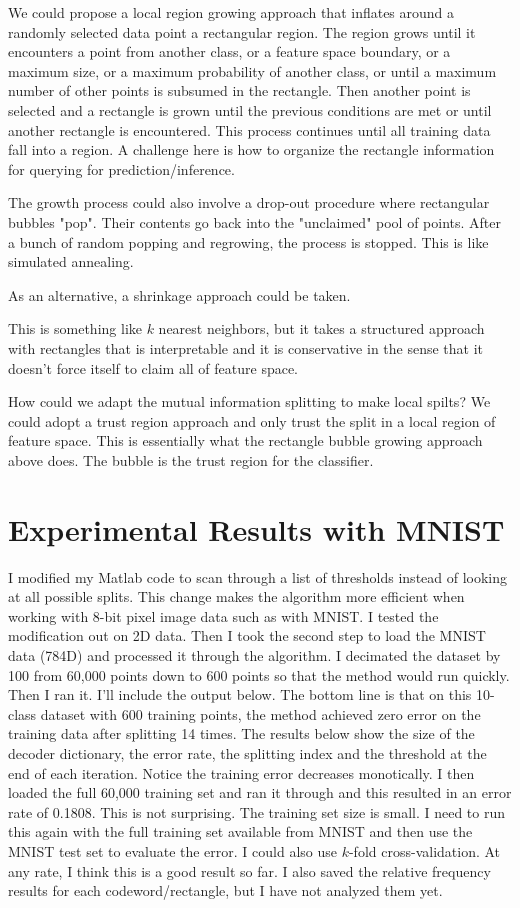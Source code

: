 \documentclass{article}
\begin{document}
We could propose a local region growing approach that inflates around a randomly selected data point a rectangular region.  The region grows until it encounters a point from another class, or a feature space boundary, or a maximum size, or a maximum probability of another class, or until a maximum number of other points is subsumed in the rectangle.  Then another point is selected and a rectangle is grown until the previous conditions are met or until another rectangle is encountered.  This process continues until all training data fall into a region.  A challenge here is how to organize the rectangle information for querying for prediction/inference.

The growth process could also involve a drop-out procedure where rectangular bubbles "pop".  Their contents go back into the "unclaimed" pool of points.  After a bunch of random popping and regrowing, the process is stopped.  This is like simulated annealing.

As an alternative, a shrinkage approach could be taken.

This is something like $k$ nearest neighbors, but it takes a structured approach with rectangles that is interpretable and it is conservative in the sense that it doesn't force itself to claim all of feature space.

How could we adapt the mutual information splitting to make local spilts?  We could adopt a trust region approach and only trust the split in a local region of feature space.  This is essentially what the rectangle bubble growing approach above does.  The bubble is the trust region for the classifier.

\section{Experimental Results with MNIST}

I modified my Matlab code to scan through a list of thresholds instead of looking at all possible splits.  This change makes the algorithm more efficient when working with 8-bit pixel image data such as with MNIST.  I tested the modification out on 2D data.  Then I took the second step to load the MNIST data (784D) and processed it through the algorithm.  I decimated the dataset by 100 from 60,000 points down to 600 points so that the method would run quickly.  Then I ran it.  I'll include the output below.  The bottom line is that on this 10-class dataset with 600 training points, the method achieved zero error on the training data after splitting 14 times.  The results below show the size of the decoder dictionary, the error rate, the splitting index and the threshold at the end of each iteration.  Notice the training error decreases monotically.  I then loaded the full 60,000 training set and ran it through and this resulted in an error rate of 0.1808.  This is not surprising.  The training set size is small.  I need to run this again with the full training set available from MNIST and then use the MNIST test set to evaluate the error.  I could also use $k$-fold cross-validation.  At any rate, I think this is a good result so far.  I also saved the relative frequency results for each codeword/rectangle, but I have not analyzed them yet.
\end{document}
